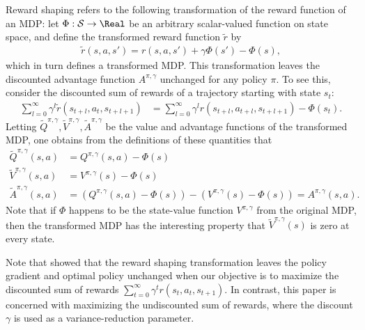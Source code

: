 \documentclass{article}
\newcommand{\delay}{l}
\newcommand{\Apigam}{A^{\pi,\gamma}}
\newcommand{\Qpigam}{Q^{\pi,\gamma}}
\newcommand{\Vpigam}{V^{\pi,\gamma}}
\newcommand{\tilr}{\tilde{r}}
\begin{document}
Reward shaping \citep{ng1999policy} refers to the following transformation of the reward function of an MDP:
let $\Phi: \mathcal{S} \rightarrow \Real$ be an arbitrary scalar-valued function on state space, and define the transformed reward function $\tilr$ by
\begin{align}
\tilr(s,a,s') = r(s,a,s') + \gamma \Phi(s') - \Phi(s), \label{eq:reshaping}
\end{align}
which in turn defines a transformed MDP.
This transformation leaves the discounted advantage function $\Apigam$ unchanged for any policy $\pi$.
To see this, consider the discounted sum of rewards of a trajectory starting with state $s_t$:
\begin{align}
\sum_{\delay=0}^{\infty} \gamma^{\delay}\tilr(s_{t+\delay},a_t,s_{t+\delay+1}) &= \sum_{\delay=0}^{\infty} \gamma^{\delay}r(s_{t+\delay},a_{t+\delay},s_{t+\delay+1}) - \Phi(s_{t}).
\label{eq:dsshaped}
\end{align}
Letting $\tilde{Q}^{\pi,\gamma},\tilde{V}^{\pi,\gamma},\tilde{A}^{\pi,\gamma}$ be the value and advantage functions of the transformed MDP, one obtains from the definitions of these quantities that
\begin{align}
\tilde{Q}^{\pi,\gamma}(s, a) &= \Qpigam(s,a) - \Phi(s)\\
\tilde{V}^{\pi,\gamma}(s, a) &= \Vpigam(s) - \Phi(s)\\
\tilde{A}^{\pi,\gamma}(s, a) &= (\Qpigam(s,a) - \Phi(s)) - (\Vpigam(s) - \Phi(s)) = \Apigam(s,a).
\end{align}
Note that if $\Phi$ happens to be the state-value function $\Vpigam$ from the original MDP, then the transformed MDP has the interesting property that $\tilde{V}^{\pi,\gamma}(s)$ is zero at every state.

Note that \citep{ng1999policy} showed that the reward shaping transformation leaves the policy gradient and optimal policy unchanged when our objective is to maximize the discounted sum of rewards $\sum_{t=0}^{\infty} \gamma^t r(s_t, a_t, s_{t+1})$.
In contrast, this paper is concerned with maximizing the undiscounted sum of rewards, where the discount $\gamma$ is used as a variance-reduction parameter.
\end{document}

